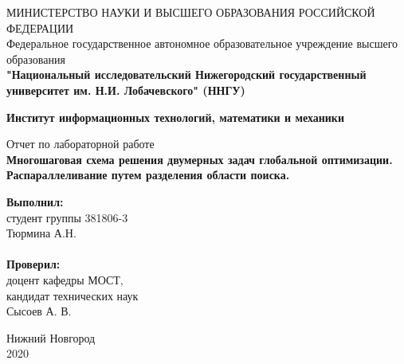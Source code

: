 \documentclass[a4paper]{report}
\begin{document}
\begin{titlepage}
\begin{center}
МИНИСТЕРСТВО НАУКИ И ВЫСШЕГО ОБРАЗОВАНИЯ РОССИЙСКОЙ ФЕДЕРАЦИИ\\
Федеральное государственное автономное образовательное учреждение высшего образования \\
\textbf{"Национальный исследовательский Нижегородский государственный университет им. Н.И. Лобачевского" (ННГУ)}
\end{center}

\begin{center}
\textbf{Институт информационных технологий, математики и механики}
\end{center}
\vspace{4em}

\begin{center}
Отчет по лабораторной работе \\
\vspace{1em}
\textbf{\Large Многошаговая схема решения двумерных задач глобальной оптимизации. Распараллеливание путем разделения области поиска.} \\
\end{center}

\vspace{4em}

\newbox{\lbox}
\newlength{\maxl}
\setlength{\maxl}{\wd\lbox}
\hfill\parbox{7cm}{
\textbf{Выполнил:} \\ 
студент группы 381806-3 \\
Тюрмина А.Н. \\
\\
\textbf{Проверил:} \\ 
доцент кафедры МОСТ, \\ 
кандидат технических наук \\ 
Сысоев А. В.
}
\vspace{\fill}

\begin{center} Нижний Новгород \\ 2020 \end{center}
\end{titlepage}

\setcounter{page}{2}
\tableofcontents{}
\clearpage
\end{document}
